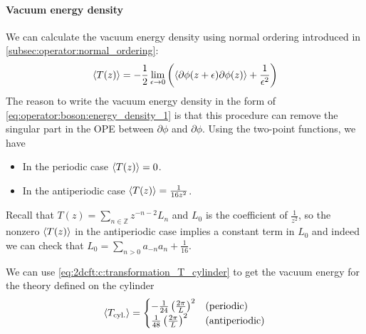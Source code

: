 \documentclass[10pt]{article}
\begin{document}
\paragraph{Vacuum energy density}
We can calculate the vacuum energy density using normal ordering introduced in \cref{subsec:operator:normal_ordering}:
\begin{align}\label{eq:operator:boson:energy_density_1}
    \expval{T(z)}=-\frac{1}{2}\lim_{\epsilon\to0}\left(\expval{\partial\phi(z+\epsilon)\partial\phi(z)}+\frac{1}{\epsilon^2}\right)
\end{align}
The reason to write the vacuum energy density in the form of \cref{eq:operator:boson:energy_density_1} is that this procedure can remove the singular part in the OPE between $\partial\phi$ and $\partial\phi$.
Using the two-point functions, we have 
\begin{itemize}
    \item In the periodic case $\expval{T(z)}=0$.
    \item In the antiperiodic case $\expval{T(z)}=\frac{1}{16z^2}$.
\end{itemize}
\begin{remark}
    Recall that $T(z)=\sum_{n\in\mathbb{Z}}z^{-n-2}L_n$ and $L_0$ is the coefficient of $\frac{1}{z^2}$, so the nonzero $\expval{T(z)}$ in the antiperiodic case implies a constant term in $L_0$ and indeed we can check that $L_0=\sum_{n>0}a_{-n}a_n+\frac{1}{16}$.
\end{remark}

We can use \cref{eq:2dcft:c:transformation_T_cylinder} to get the vacuum energy for the theory defined on the cylinder 
\begin{align}
    \expval{T_{\text{cyl.}}}=\begin{cases}
                                 -\frac{1}{24}\left(\frac{2\pi}{L}\right)^2 & \text{(periodic)}     \\
                                 \frac{1}{48}\left(\frac{2\pi}{L}\right)^2  & \text{(antiperiodic)}
                             \end{cases}
\end{align}
\end{document}
